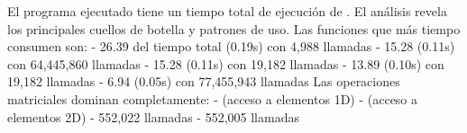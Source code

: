 \markdownRendererDocumentBegin
\markdownRendererSectionBegin
{}\markdownRendererInterblockSeparator
{}El programa ejecutado tiene un tiempo total de ejecución de . El análisis revela los principales cuellos de botella y patrones de uso.\markdownRendererInterblockSeparator
{}\markdownRendererSectionBegin
{}\markdownRendererInterblockSeparator
{}Las funciones que más tiempo consumen son:\markdownRendererInterblockSeparator
{}\markdownRendererUlBeginTight
\markdownRendererUlItem {} - 26.39\markdownRendererPercentSign{} del tiempo total (0.19s) con 4,988 llamadas\markdownRendererUlItemEnd 
\markdownRendererUlItem {} - 15.28\markdownRendererPercentSign{} (0.11s) con 64,445,860 llamadas\markdownRendererUlItemEnd 
\markdownRendererUlItem {} - 15.28\markdownRendererPercentSign{} (0.11s) con 19,182 llamadas \markdownRendererUlItemEnd 
\markdownRendererUlItem {} - 13.89\markdownRendererPercentSign{} (0.10s) con 19,182 llamadas\markdownRendererUlItemEnd 
\markdownRendererUlItem {} - 6.94\markdownRendererPercentSign{} (0.05s) con 77,455,943 llamadas\markdownRendererUlItemEnd 
\markdownRendererUlEndTight \markdownRendererInterblockSeparator
{}
\markdownRendererSectionEnd \markdownRendererSectionBegin
{}\markdownRendererInterblockSeparator
{}Las operaciones matriciales dominan completamente:\markdownRendererInterblockSeparator
{}\markdownRendererUlBeginTight
\markdownRendererUlItem {} -  (acceso a elementos 1D)\markdownRendererUlItemEnd 
\markdownRendererUlItem {} -  (acceso a elementos 2D)\markdownRendererUlItemEnd 
\markdownRendererUlItem {} - 552,022 llamadas\markdownRendererUlItemEnd 
\markdownRendererUlItem {} - 552,005 llamadas\markdownRendererUlItemEnd 
